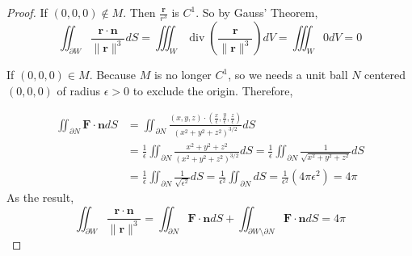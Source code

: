 \documentclass[11pt]{article}
\begin{document}
\begin{proof}
If $(0,0,0)\notin M$. Then $\frac{\mathbf{r}}{r^3}$ is $C^1$. So by Gauss' Theorem,
$$\iint_{\partial W} \frac{\mathbf{r} \cdot \mathbf{n}}{\|\mathbf{r}\|^{3}}dS=\iiint_{W} \operatorname{div}\left(\frac{\mathbf{r}}{\|\mathbf{r}\|^{3}}\right) d V=\iiint_{W} 0 d V=0$$

If $(0,0,0)\in M$. Because $M$ is no longer $C^1$, so we needs a unit ball $N$ centered $(0,0,0)$ of radius $\epsilon > 0$ to exclude the origin. Therefore, 

$$
\begin{aligned}
    \iint_{\partial N} \mathbf{F} \cdot \mathbf{n} d S &=\iint_{\partial N} \frac{(x, y, z) \cdot\left(\frac{x}{\epsilon}, \frac{y}{\epsilon}, \frac{z}{\epsilon}\right)}{\left(x^{2}+y^{2}+z^{2}\right)^{3 / 2}} d S \\
    &=\frac{1}{\epsilon} \iint_{\partial N} \frac{x^{2}+y^{2}+z^{2}}{\left(x^{2}+y^{2}+z^{2}\right)^{3 / 2}} d S=\frac{1}{\epsilon} \iint_{\partial N} \frac{1}{\sqrt{x^{2}+y^{2}+z^{2}}} d S \\
    &=\frac{1}{\epsilon} \iint_{\partial N} \frac{1}{\sqrt{\epsilon^{2}}} d S=\frac{1}{\epsilon^{2}} \iint_{\partial N} d S=\frac{1}{\epsilon^{2}}\left(4 \pi \epsilon^{2}\right)=4 \pi
    \end{aligned}
$$
As the result,
$$\iint_{\partial W} \frac{\mathbf{r} \cdot \mathbf{n}}{\|\mathbf{r}\|^{3}}=\iint_{\partial N} \mathbf{F} \cdot \mathbf{n} d S+\iint_{\partial W \setminus \partial N} \mathbf{F} \cdot \mathbf{n} d S=4\pi$$

\end{proof}

\newpage
\end{document}
